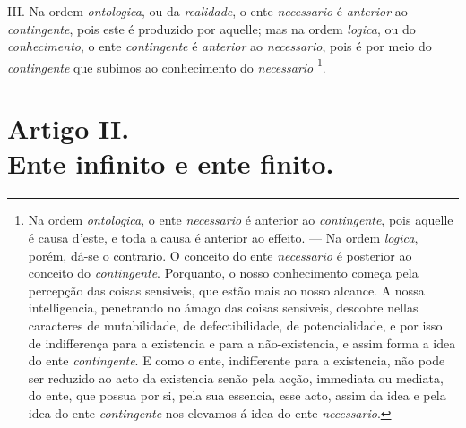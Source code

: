  III. Na ordem \emph{ontologica}, ou da \emph{realidade}, o ente \emph{necessario} é \emph{anterior} ao \emph{contingente}, pois este é produzido por aquelle; mas na ordem \emph{logica}, ou do \emph{conhecimento}, o ente \emph{contingente} é \emph{anterior} ao \emph{necessario}, pois é por meio do \emph{contingente} que subimos ao conhecimento do \emph{necessario} \footnote{Na ordem \emph{ontologica}, o ente \emph{necessario} é anterior ao \emph{contingente}, pois aquelle é causa d'este, e toda a causa é anterior ao effeito. --- Na ordem \emph{logica}, porém, dá-se o contrario. O conceito do ente \emph{necessario} é posterior ao conceito do \emph{contingente}. Porquanto, o nosso conhecimento começa pela percepção das coisas sensiveis, que estão mais ao nosso alcance. A nossa intelligencia, penetrando no ámago das coisas sensiveis, descobre nellas caracteres de mutabilidade, de defectibilidade, de potencialidade, e por isso de indifferença para a existencia e para a não-existencia, e assim forma a idea do ente \emph{contingente}. E como o ente, indifferente para a existencia, não pode ser reduzido ao acto da existencia senão pela acção, immediata ou mediata, do ente, que possua por si, pela sua essencia, esse acto, assim da idea e pela idea do ente \emph{contingente} nos elevamos á idea do ente \emph{necessario}.}.


\section*{Artigo II.\\ Ente infinito e ente finito.}

